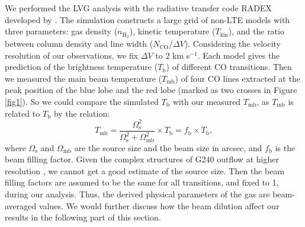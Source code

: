 
We performed the LVG analysis with the radiative transfer code RADEX developed by \citet{2007A&A...468..627V}. The simulation constructs a large grid of non-LTE models with three parameters: gas density ($n_{\mathrm{H}_2}$), kinetic temperature ($T_{\mathrm{kin}}$), and the ratio between column density and line width ($N_{\mathrm{CO}}$/$\Delta V$). Considering the velocity resolution of our observations, we fix $\Delta V$ to 2 km s$^{-1}$. Each model gives the prediction of the brightness temperature ($T_\mathrm{b}$) of different CO transitions. Then we measured the main beam temperature ($T_{\mathrm{mb}}$) of four CO lines extracted at the peak position of the blue lobe and the red lobe (marked as two crosses in Figure \ref{fig1}). So we could compare the simulated $T_\mathrm{b}$ with our measured $T_{\mathrm{mb}}$, as $T_{\mathrm{mb}}$ is related to $T_\mathrm{b}$ by the relation:
\begin{equation}
T_{\mathrm{mb}} = \frac{\Omega_{\mathrm{s}}^2}{\Omega_{\mathrm{s}}^2+\Omega_{\mathrm{mb}}^2}\times T_\mathrm{b} = f_{\mathrm{b}} \times T_\mathrm{b},
\end{equation}
where $\Omega_{\mathrm{s}}$ and $\Omega_{\mathrm{mb}}$ are the source size and the beam size in arcsec, and $f_{\mathrm{b}}$ is the beam filling factor. Given the complex structures of G240 outflow at higher resolution \citep{2009ApJ...696...66Q}, we cannot get a good estimate of the source size. Then the beam filling factors are assumed to be the same for all transitions, and fixed to 1, during our analysis. Thus, the derived physical parameters of the gas are beam-averaged values. We would further discuss how the beam dilution affect our results in the following part of this section.

